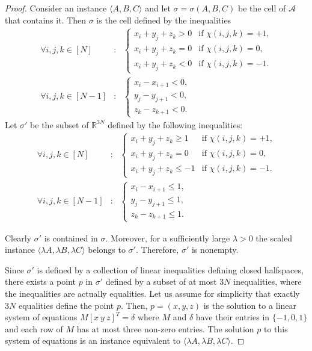 \begin{proof}
Consider an instance $\langle A,B,C \rangle$ and let $\sigma=\sigma(A,B,C)$
be the cell of $\mathcal{A}$ that contains it.
Then $\sigma$ is the cell defined by the inequalities
\begin{align*}
	\forall{i,j,k}\in [N]&:~~~
	\begin{cases}
		x_i+y_j+z_k > 0 & \text{if $\chi(i,j,k)=+1$,}\\
		x_i+y_j+z_k = 0 & \text{if $\chi(i,j,k)=0$,}\\
		x_i+y_j+z_k < 0 & \text{if $\chi(i,j,k)=-1$.}
	\end{cases}\\
	\forall{i,j,k}\in [N-1]&:~~~
		\begin{cases}
		x_i - x_{i+1}<0,\\
		y_j - y_{j+1}<0,\\
		z_k - z_{k+1}<0.
	\end{cases}
\end{align*}
Let $\sigma'$ be the subset of $\mathbb{R}^{3N}$ defined by the following inequalities:
\begin{align*}
	\forall{i,j,k}\in [N]&:~~~
	\begin{cases}
		x_i+y_j+z_k \geq 1 & \text{if $\chi(i,j,k)=+1$,}\\
		x_i+y_j+z_k = 0 & \text{if $\chi(i,j,k)=0$,}\\
		x_i+y_j+z_k \leq -1 & \text{if $\chi(i,j,k)=-1$.}
	\end{cases}\\
	\forall{i,j,k}\in [N-1]&:~~~
		\begin{cases}
		x_i - x_{i+1} \leq 1,\\
		y_j - y_{j+1} \leq 1,\\
		z_k - z_{k+1} \leq 1.
	\end{cases}
\end{align*}

Clearly $\sigma'$ is contained in $\sigma$. Moreover, for a sufficiently large $\lambda>0$
the scaled instance $\langle \lambda A,\lambda B,\lambda C \rangle$ belongs to $\sigma'$.
Therefore, $\sigma'$ is nonempty.

Since $\sigma'$ is defined by a collection of linear inequalities defining closed halfspaces,
there exists a point $p$ in $\sigma'$ defined by a subset of at most $3N$ inequalities,
where the inequalities are actually equalities. Let us assume for simplicity that
exactly $3N$ equalities define the point $p$. Then, $p=(x,y,z)$ is the solution
to a linear system of equations $M [x~ y ~z]^T=\delta$
where $M$ and $\delta$ have their entries in $\{ -1,0,1 \}$
and each row of $M$ has at most three non-zero entries. The solution $p$ to this
system of equations is an instance equivalent to $\langle \lambda A,\lambda B,\lambda C \rangle$.


\end{proof}
